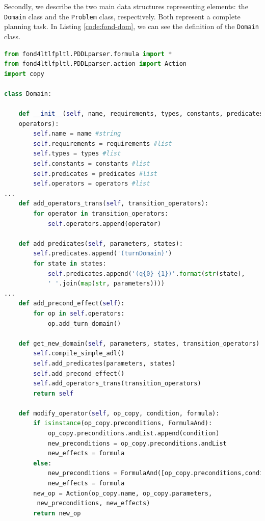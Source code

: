 Secondly, we describe the two main data structures representing \PDDL elements: the \texttt{Domain} class and the \texttt{Problem} class, respectively. Both represent a complete planning task. In Listing \ref{code:fond-dom}, we can see the definition of the \texttt{Domain} class.

\begin{lstlisting}[language=Python, style=Python, escapechar = £,  label={code:fond-dom}, caption={The \texttt{Domain} class.}]
from fond4ltlfpltl.PDDLparser.formula import *
from fond4ltlfpltl.PDDLparser.action import Action
import copy

class Domain:

    def __init__(self, name, requirements, types, constants, predicates, 
    operators):
        self.name = name #string
        self.requirements = requirements #list
        self.types = types #list
        self.constants = constants #list
        self.predicates = predicates #list
        self.operators = operators #list
...
    def add_operators_trans(self, transition_operators):
        for operator in transition_operators:
            self.operators.append(operator)

    def add_predicates(self, parameters, states):
        self.predicates.append('(turnDomain)')
        for state in states:
            self.predicates.append('(q{0} {1})'.format(str(state), 
            ' '.join(map(str, parameters))))
...
    def add_precond_effect(self):
        for op in self.operators:
            op.add_turn_domain()

    def get_new_domain(self, parameters, states, transition_operators):£\label{line:new-dom}£
        self.compile_simple_adl()
        self.add_predicates(parameters, states)
        self.add_precond_effect()
        self.add_operators_trans(transition_operators)
        return self

    def modify_operator(self, op_copy, condition, formula):
        if isinstance(op_copy.preconditions, FormulaAnd):
            op_copy.preconditions.andList.append(condition)
            new_preconditions = op_copy.preconditions.andList
            new_effects = formula
        else:
            new_preconditions = FormulaAnd([op_copy.preconditions,condition])
            new_effects = formula
        new_op = Action(op_copy.name, op_copy.parameters,
         new_preconditions, new_effects)
        return new_op


\end{lstlisting}
